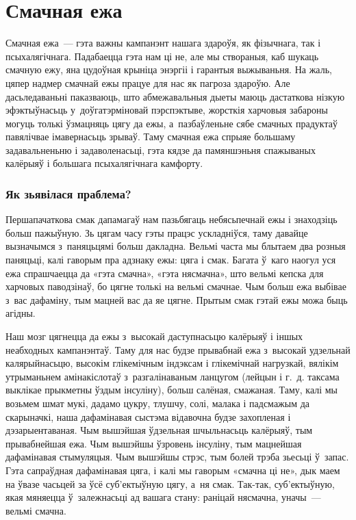 \chapter{Смачная ежа}

Смачная ежа~--- гэта важны кампанэнт нашага здароўя, як фізычнага, так і псыхалягічнага. Падабаецца гэта нам ці не, але мы створаныя, каб шукаць смачную ежу, яна цудоўная крыніца энэргіі і гарантыя выжываньня. На жаль, цяпер надмер смачнай ежы працуе для нас як пагроза здароўю. Але дасьледаваньні паказваюць, што абмежавальныя дыеты маюць дастаткова нізкую эфэктыўнасьць у~доўгатэрміновай пэрспэктыве, жорсткія харчовыя забароны могуць толькі ўзмацняць цягу да ежы, а~пазбаўленьне сябе смачных прадуктаў павялічвае імавернасьць зрываў. Таму смачная ежа спрыяе большаму задавальненьню і задаволенасьці, гэта кядзе да памяншэньня спажываных калёрыяў і большага псыхалягічнага камфорту.

\subsection{Як зьявілася праблема?}

Першапачаткова смак дапамагаў нам пазьбягаць небясьпечнай ежы і знаходзіць больш пажыўную. Зь цягам часу гэты працэс ускладніўся, таму давайце вызначымся з~паняцьцямі больш дакладна. Вельмі часта мы блытаем два розныя паняцьці, калі гаворым пра адзнаку ежы: цяга і смак. Багата ў~каго наогул уся ежа спрашчаецца да «гэта смачна», «гэта нясмачна», што вельмі кепска для харчовых паводзінаў, бо цягне толькі на вельмі смачнае. Чым больш ежа выбівае з~вас дафаміну, тым мацней вас да яе цягне. Прытым смак гэтай ежы можа быць агідны.

Наш мозг цягнецца да ежы з~высокай даступнасьцю калёрыяў і іншых неабходных кампанэнтаў. Таму для нас будзе прывабнай ежа з~высокай удзельнай калярыйнасьцю, высокім глікемічным індэксам і глікемічнай нагрузкай, вялікім утрыманьнем амінакіслотаў з~разгалінаваным ланцугом (лейцын і г.~д. таксама выклікае прыкметны ўздым інсуліну), больш салёная, смажаная. Таму, калі мы возьмем шмат мукі, дадамо цукру, тлушчу, солі, малака і падсмажым да скарыначкі, наша дафамінавая сыстэма відавочна будзе захопленая і дэзарыентаваная. Чым вышэйшая ўдзельная шчыльнасьць калёрыяў, тым прывабнейшая ежа. Чым вышэйшы ўзровень інсуліну, тым мацнейшая дафамінавая стымуляцыя. Чым вышэйшы стрэс, тым болей трэба зьесьці ў~запас. Гэта сапраўдная дафамінавая цяга, і калі мы гаворым «смачна ці не», дык маем на ўвазе часьцей за ўсё суб'ектыўную цягу, а~ня смак. Так-так, суб'ектыўную, якая мяняецца ў~залежнасьці ад вашага стану: раніцай нясмачна, уначы~--- вельмі смачна.

